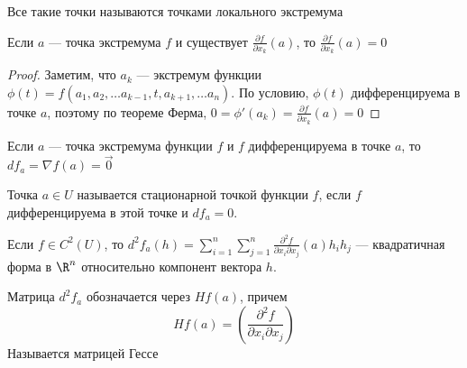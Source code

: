 \begin{note}
    Все такие точки называются точками локального экстремума
\end{note}

\begin{theorem}
    Если \(a\) --- точка экстремума \(f\) и существует \(\frac{\partial f}{\partial x_k}(a)\), то \(\frac{\partial f}{\partial x_k}(a) = 0\)
\end{theorem}
\begin{proof}
    Заметим, что \(a_k\) --- экстремум функции \(\phi(t) = f(a_1, a_2, \dots a_{k - 1}, t, a_{k + 1}, \dots a_n)\). По условию, \(\phi(t)\) дифференцируема в точке \(a\), поэтому по теореме Ферма, \(0 = \phi'(a_k) = \frac{\partial f}{\partial x_k}(a) = 0\)
\end{proof}

\begin{corollary}
    Если \(a\) --- точка экстремума функции \(f\) и \(f\) дифференцируема в точке \(a\), то \(df_a = \nabla f(a) = \vec{0}\)
\end{corollary}

\begin{definition}
    Точка \(a \in U\) называется стационарной точкой функции \(f\), если \(f\) дифференцируема в этой точке и \(df_a = 0\).
\end{definition}

\begin{reminder}
    Если \(f \in C^2(U)\), то \(d^2f_a(h) = \sum_{i = 1}^n\sum_{j = 1}^n \frac{\partial^2 f}{\partial x_i \partial x_j}(a)h_ih_j\) --- квадратичная форма в \(\R^n\) относительно компонент вектора \(h\).
\end{reminder}

\begin{definition}
    Матрица \(d^2f_a\) обозначается через \(Hf(a)\), причем
    \[Hf(a) = \left( \frac{\partial^2 f}{\partial x_i \partial x_j}\right)\]
    Называется матрицей Гессе
\end{definition}

